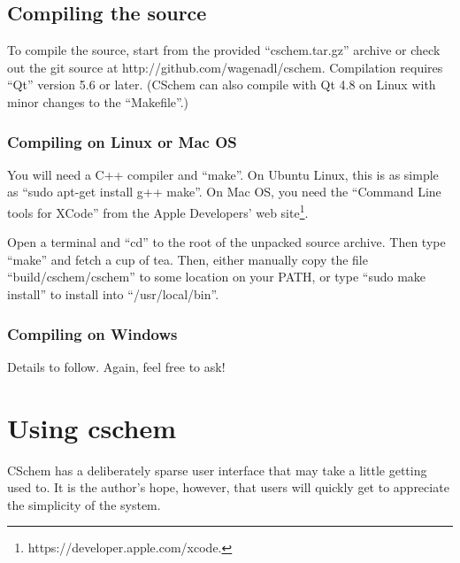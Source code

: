 \documentclass[11pt]{report}
\begin{document}

\section{Compiling the source}
To compile the source,  start from the provided
``cschem.tar.gz'' archive or check out the git source at
http://github.com/wagenadl/cschem. Compilation requires
``Qt'' version 5.6 or later. (CSchem can also compile with Qt 4.8 on
Linux with minor changes to the ``Makefile''.)

\subsection{Compiling on Linux or Mac OS}

You will need a C++ compiler and ``make''. On Ubuntu Linux, this is as simple
as ``sudo apt-get install g++ make''. On Mac OS, you need the
``Command Line tools for XCode'' from the Apple Developers' web
site\footnote{https://developer.apple.com/xcode.}.

Open a terminal and ``cd'' to the root of the unpacked source
archive. Then type ``make'' and fetch a cup of tea. Then, either
manually copy the file ``build/cschem/cschem'' to some location on your PATH, or type ``sudo make
install'' to install into ``/usr/local/bin''.

\subsection{Compiling on Windows}

Details to follow. Again, feel free to ask!
% 

\chapter{Using cschem}

CSchem has a deliberately sparse user interface that may take a little
getting used to. It is the author's hope, however, that users will
quickly get to appreciate the simplicity of the system.
\end{document}
